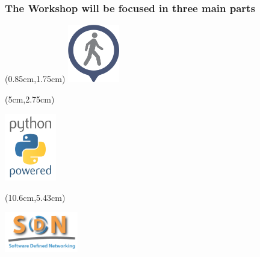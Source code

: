 \documentclass{beamer}
\begin{document}
\begin{frame}
  \frametitle{The Workshop will be focused in three main parts}

  \begin{textblock*}{2.5cm} (0.85cm,1.75cm) %
    \captionsetup{justification=centering}
    \includegraphics[width=2.25cm]{./images/walkthrough.png} %
  \end{textblock*}

  \begin{textblock*}{5cm} (5cm,2.75cm) %
    \begin{center}
    \includegraphics[width=2.25cm]{images/python.png}
    \end{center}
  \end{textblock*}

  \begin{textblock*}{4cm} (10.6cm,5.43cm) %
    \begin{center}
    \includegraphics[width=3.2cm]{images/sdn.png}
    \end{center}
  \end{textblock*}

\end{frame}
\end{document}
